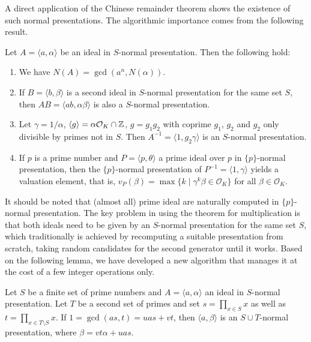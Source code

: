 \documentclass{sig-alternate-05-2015}
\begin{document}
A direct application of the Chinese remainder theorem shows the existence of such normal presentations.
The algorithmic importance comes from the following result.

\begin{theorem}
Let $A = \langle a, \alpha \rangle$ be an ideal in $S$-normal presentation. Then the following hold:
\begin{enumerate}
\item We have $N(A) = \gcd(a^n, N(\alpha))$.
\item If $B = \langle b, \beta\rangle$ is a second ideal in $S$-normal
presentation for the same set $S$, then
$AB = \langle ab, \alpha\beta\rangle$ is also a $S$-normal presentation.
\item Let $\gamma = 1/\alpha$, $\langle g\rangle = \alpha \mathcal O_K \cap \mathbb{Z}$,
 $g = g_1g_2$ with coprime $g_1$, $g_2$ and $g_2$ only divisible by primes not in $S$. Then $A^{-1} = \langle 1, g_2\gamma\rangle$ is an $S$-normal presentation.
\item If $p$ is a prime number and $P= \langle p, \theta\rangle$ a prime ideal over $p$
in $\{p\}$-normal presentation, then the $\{p\}$-normal presentation
of $P^{-1} = \langle 1, \gamma\rangle$ yields a valuation element, that is,
$v_P(\beta) = \max\{ k \mid \gamma^k\beta\in \mathcal O_K\}$ for all $\beta \in \mathcal O_K$.
\end{enumerate}
\end{theorem}

It should be noted that (almost all) prime ideal are naturally computed
in $\{p\}$-normal presentation. The key problem in using the theorem for
multiplication is that both ideals need to be given by an $S$-normal presentation for
the same set $S$, which traditionally is achieved by recomputing
a suitable presentation from scratch, taking random candidates for the
second generator until it works. Based on the following lemma, we have developed a new algorithm that manages it at the cost 
of a few integer operations only.

\begin{lemma}
Let $S$ be a finite set of prime numbers and $A=\langle a, \alpha\rangle$ an ideal in
$S$-normal presentation. Let $T$ be a second set of primes and set
$s = \prod_{x\in S} x$ as well as $t = \prod_{x\in T\setminus S} x$. If $1 = \gcd(as, t) = uas + vt$,
then $\langle a, \beta \rangle$ is an $S\cup T$-normal presentation, where $\beta = vt\alpha + uas$.
\end{lemma}
\end{document}
